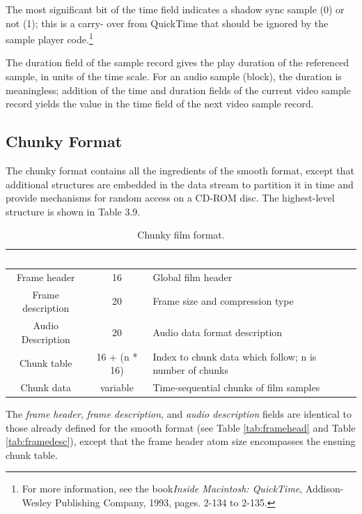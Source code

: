 \documentclass[12pt,letterpaper,twoside]{article}
\newcommand{\tabheadtxt}[1]{\multicolumn{1}{c}{\textcolor{white}{\textbf{#1}}}}
\begin{document}
The most significant bit of the time field indicates a shadow sync sample (0) or not (1); this is a carry- over from QuickTime that should be ignored by the sample player code.\footnote{For more information, see the book\textit{Inside Macintosh: QuickTime}, Addison-Wesley Publishing Company, 1993, pages. 2-134 to 2-135.}

The duration field of the sample record gives the play duration of the referenced sample, in units of the time scale. For an audio sample (block), the duration is meaningless; addition of the time and duration fields of the current video sample record yields the value in the time field of the next video sample record.

\subsection{Chunky Format}

The chunky format contains all the ingredients of the smooth format, except that additional structures are embedded in the data stream to partition it in time and provide mechanisms for random access on a CD-ROM disc. The highest-level structure is shown in Table 3.9. 

\begin{table}[h]
\centering
\begin{tabular}{|c|c|p{10cm}|}
\hline
\rowcolor{black}
\tabheadtxt{Field} & \tabheadtxt{Size} & \tabheadtxt{Description} \\
\hline
Frame header & 16 & Global film header\\
\hline
Frame description & 20 & Frame size and compression type\\
\hline
Audio Description & 20  & Audio data format description\\
\hline
Chunk table & 16 + (n * 16) & Index to chunk data which follow; n is number of chunks\\
\hline
Chunk data & variable & Time-sequential chunks of film samples\\
\hline
\end{tabular}
\caption{Chunky film format.}
\label{tab:chunkyfmt}
\end{table}
\FloatBarrier

The \textit{frame header}, \textit{frame description}, and \textit{audio description} fields are identical to those already defined for the smooth format (see Table \ref{tab:framehead} and Table \ref{tab:framedesc}), except that the frame header atom size encompasses the ensuing chunk table. 
\end{document}
